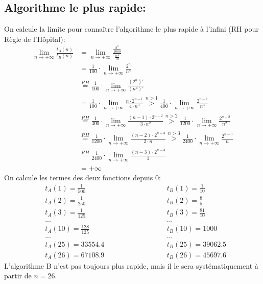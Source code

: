 \documentclass{article}
\begin{document}
\subsection{Algorithme le plus rapide:}
On calcule la limite pour connaître l'algorithme le plus rapide à l'infini (RH pour Règle de l'Hôpital):
$$
\begin{aligned}
  \lim_{n\rightarrow +\infty}\frac{t_A(n)}{t_B(n)} &=
  \lim_{n\rightarrow +\infty}\frac{\frac{2^n}{1000}}{\frac{n^4}{10}} \\
  &= \frac{1}{100}\cdot\lim_{n\rightarrow +\infty}\frac{2^n}{n^4} \\
  &\stackrel{RH}{=} \frac{1}{100}\cdot\lim_{n\rightarrow +\infty}\frac{(2^n)'}{(n^4)'} \\
  &= \frac{1}{100}\cdot\lim_{n\rightarrow +\infty}\frac{n\cdot 2^{n-1}}{4 \cdot n^3}
  \stackrel{n>1}{>}\frac{1}{400}\cdot\lim_{n\rightarrow +\infty}\frac{2^{n-1}}{n^3}\\
  &\stackrel{RH}{=}\frac{1}{400}\cdot\lim_{n\rightarrow +\infty}\frac{(n-1)\cdot 2^{n-2}}{3 \cdot n^2}
  \stackrel{n>2}{>}\frac{1}{1200}\cdot\lim_{n\rightarrow +\infty}\frac{2^{n-2}}{n^2}\\
  &\stackrel{RH}{=}\frac{1}{1200}\cdot\lim_{n\rightarrow +\infty}\frac{(n-2)\cdot 2^{n-3}}{2 \cdot n}
  \stackrel{n>3}{>}\frac{1}{2400}\cdot\lim_{n\rightarrow +\infty}\frac{2^{n-3}}{n}\\
  &\stackrel{RH}{=}\frac{1}{2400}\cdot\lim_{n\rightarrow +\infty}\frac{(n-3)\cdot 2^{n-3}}{1}\\
  &= +\infty
\end{aligned}
$$
On calcule les termes des deux fonctions depuis 0:
$$
\begin{aligned}
  &t_A(1)=\frac{1}{500} \hspace{3cm} &&t_B(1)=\frac{1}{10}\\
  &t_A(2)=\frac{1}{250} \hspace{3cm} &&t_B(2)=\frac{8}{5}\\
  &t_A(3)=\frac{1}{125} \hspace{3cm} &&t_B(3)=\frac{81}{10}\\
  &... &&...\\
  &t_A(10)=\frac{128}{125} \hspace{3cm} &&t_B(10)=1000\\
  &... &&...\\
  &t_A(25)=\num{33554.4} \hspace{3cm} &&t_B(25)=\num{39062.5}\\
  &t_A(26)=\num{67108.9} \hspace{3cm} &&t_B(26)=\num{45697.6}
\end{aligned}
$$
L'algorithme B n'est pas toujours plus rapide, mais il le sera systématiquement à partir de $n=26$.
\end{document}
